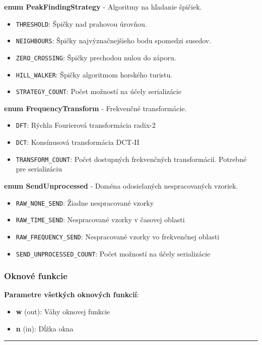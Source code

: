 \noindent\textbf{enum PeakFindingStrategy} - Algoritmy na hľadanie špičiek.
	\begin{itemize}[noitemsep, topsep=0pt]
		\item \verb|THRESHOLD|: Špičky nad prahovou úrovňou.
		\item \verb|NEIGHBOURS|: Špičky najvýznačnejšieho bodu spomedzi susedov.
		\item \verb|ZERO_CROSSING|: Špičky prechodou nulou do záporu.
		\item \verb|HILL_WALKER|: Špičky algoritmom horského turistu. 
		\item \verb|STRATEGY_COUNT|: Počet možností na účely serializácie
	\end{itemize}
\bigbreak

\noindent\textbf{enum FrequencyTransform} - Frekvenčné transformácie.
	\begin{itemize}[noitemsep, topsep=0pt]
		\item \verb|DFT|: Rýchla Fourierová transformácia radix-2
		\item \verb|DCT|: Konsínusová transformácia DCT-II
		\item \verb|TRANSFORM_COUNT|: Počet dostupných frekvenčných transformácií. Potrebné pre serializáciu
	\end{itemize}
\bigbreak

\noindent\textbf{enum SendUnprocessed} - Doména odosielaných nespracovaných vzoriek.
	\begin{itemize}[noitemsep, topsep=0pt]
		\item \verb|RAW_NONE_SEND|: Žiadne nespracované vzorky 	
		\item \verb|RAW_TIME_SEND|: Nespracované vzorky v časovej oblasti 	
		\item \verb|RAW_FREQUENCY_SEND|: Nespracované vzorky vo frekvenčnej oblasti 
		\item \verb|SEND_UNPROCESSED_COUNT|: Počet možností na účely serializácie
	\end{itemize}
\bigbreak


\subsubsection*{Oknové funkcie}
\textbf{Parametre všetkých oknových funkcií}:
\begin{itemize}[noitemsep, topsep=0pt]
	\item \textbf{w} (out): Váhy oknovej funkcie
	\item \textbf{n} (in): Dĺžka okna  
\end{itemize}
\bigbreak
\hrule

